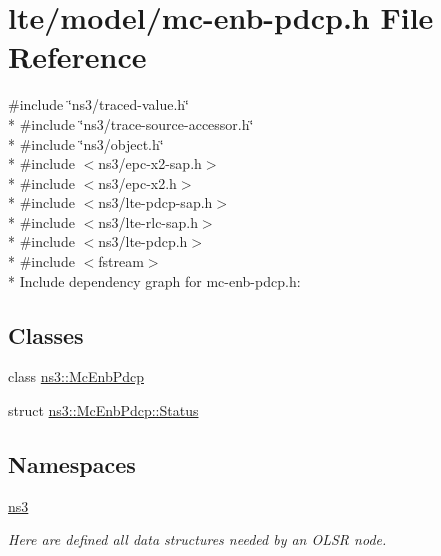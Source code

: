 \hypertarget{mc-enb-pdcp_8h}{}\section{lte/model/mc-\/enb-\/pdcp.h File Reference}
\label{mc-enb-pdcp_8h}
{\ttfamily \#include \char`\"{}ns3/traced-\/value.\+h\char`\"{}}\\*
{\ttfamily \#include \char`\"{}ns3/trace-\/source-\/accessor.\+h\char`\"{}}\\*
{\ttfamily \#include \char`\"{}ns3/object.\+h\char`\"{}}\\*
{\ttfamily \#include $<$ns3/epc-\/x2-\/sap.\+h$>$}\\*
{\ttfamily \#include $<$ns3/epc-\/x2.\+h$>$}\\*
{\ttfamily \#include $<$ns3/lte-\/pdcp-\/sap.\+h$>$}\\*
{\ttfamily \#include $<$ns3/lte-\/rlc-\/sap.\+h$>$}\\*
{\ttfamily \#include $<$ns3/lte-\/pdcp.\+h$>$}\\*
{\ttfamily \#include $<$fstream$>$}\\*
Include dependency graph for mc-\/enb-\/pdcp.h\+:
\subsection*{Classes}
\begin{DoxyCompactItemize}
\item 
class \hyperlink{classns3_1_1McEnbPdcp}{ns3\+::\+Mc\+Enb\+Pdcp}
\item 
struct \hyperlink{structns3_1_1McEnbPdcp_1_1Status}{ns3\+::\+Mc\+Enb\+Pdcp\+::\+Status}
\end{DoxyCompactItemize}
\subsection*{Namespaces}
\begin{DoxyCompactItemize}
\item 
 \hyperlink{namespacens3}{ns3}
\begin{DoxyCompactList}\small\item\em Here are defined all data structures needed by an O\+L\+SR node. \end{DoxyCompactList}\end{DoxyCompactItemize}
